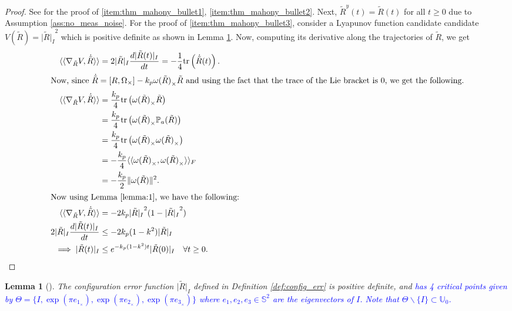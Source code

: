 \documentclass{article}
\newtheorem{lemma}{Lemma}
\newcommand{\trace}[1]{\text{tr}\left(#1\right)}
\newcommand{\textblue}[1]{\textcolor{blue}{#1}}
\newcommand{\Rtilde}{\tilde{R}}
\newcommand{\normSOthree}[1]{{{\vert}#1 {\vert}_I}}
\newcommand{\expo}[1]{e^{#1}}
\newcommand{\frobenius}[2]{\langle\langle #1, #2\rangle\rangle_F}
\newcommand{\dualpairing}[2]{\langle\langle #1 , #2 \rangle\rangle}
\newcommand{\grad}[2]{\nabla_{#1}{#2}}
\begin{document}
\begin{proof}
    See {\cite[Theorem 4.2]{mahony_complementaryFilter}} for the proof of \ref{item:thm_mahony_bullet1}, \ref{item:thm_mahony_bullet2}. Next, $\Rtilde^y(t) = \Rtilde(t)$ for all $t\geq 0$ due to Assumption \ref{ass:no_meas_noise}. For the proof of \ref{item:thm_mahony_bullet3}, consider a Lyapunov function candidate candidate $V(\Rtilde) = \normSOthree{\Rtilde}^2$ which is positive definite as shown in Lemma \ref{lemma:lyapfunc}. Now, computing its derivative along the trajectories of $\Rtilde$, we get 
    \begin{align*}
        \dualpairing{\grad{\Rtilde}{V}}{\dot{\Rtilde}} &= 2\normSOthree{\Rtilde}\frac{d \normSOthree{\Rtilde(t)}}{dt} = -\frac{1}{4}\trace{\dot{\Rtilde}(t)}.\\
        \intertext{Now, since $\dot{\Rtilde} = [R, \Omega_\times] - k_p{\omega(\Rtilde)}_\times\Rtilde$ and using the fact that the trace of the Lie bracket is $0$, we get the following.}
        \dualpairing{\grad{\Rtilde}{V}}{\dot{\Rtilde}} &= \frac{k_p}{4}\trace{{{\omega(\Rtilde)}_\times}\Rtilde}\\
        &= \frac{k_p}{4}\trace{{\omega(\Rtilde)}_\times \mathbb{P}_a{(\Rtilde)}}\\
        &= \frac{k_p}{4}\trace{{\omega(\Rtilde)}_\times {\omega(\Rtilde)}_\times}\\
        &= -\frac{k_p}{4}\frobenius{{\omega(\Rtilde)}_\times}{{\omega(\Rtilde)}_\times}\\
        &= -\frac{k_p}{2}\|\omega(\Rtilde)\|^2.\\
        \intertext{Now using Lemma \ref{lemma:1}, we have the following:}
        \dualpairing{\grad{\Rtilde}{V}}{\dot{\Rtilde}}  &= -2k_p\normSOthree{\Rtilde}^2(1-\normSOthree{\Rtilde}^2)\\
        2\normSOthree{\Rtilde}\frac{d\normSOthree{\Rtilde(t)}}{dt}&\leq -2k_p(1-k^2)\normSOthree{\Rtilde}\\ 
        \implies \normSOthree{\Rtilde(t)} &\leq \expo{-k_p(1-k^2)t}\normSOthree{\Rtilde(0)} \quad \forall t\geq 0.
    \end{align*}
\end{proof}

\begin{lemma}[\textblue{{\cite[Lemma 5.6]{Chillingworth}}}] \label{lemma:lyapfunc}
    The configuration error function $\normSOthree{\Rtilde}$ defined in Definition \ref{def:config_err} is positive definite, and \textblue{has 4 critical points given by $\Theta =  \{I, \exp(\pi e_{1_{\times}}),  \exp(\pi e_{2_{\times}}), \exp(\pi e_{3_{\times}})\}$ where $e_1, e_2, e_3 \in \mathbb{S}^2$ are the eigenvectors of $I$. Note that $\Theta\backslash\{I\}\subset \mathbb{U}_0$. }
\end{lemma}
\end{document}
